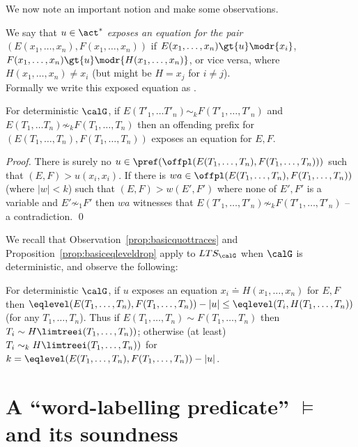 \documentclass[12pt]{article}
\begin{document}
We now note an important notion 
and make some 
observations.

\begin{defn}
We say that \mbox{$u\in\act^*$} 
\emph{exposes an equation for 
the pair} 
\\
$(E(x_1,\dots,x_n), F(x_1,\dots,x_n))$ 
if 
$E(x_1,\dots,x_n)\gt{u} \modr{x_i}$, 
$F(x_1,\dots,x_n)\gt{u} \modr{H(x_1,\dots,x_n)}$,
or vice versa, where $H(x_1,\dots,x_n)\neq
x_i$ (but might be $H=x_j$ for $i\neq j$).
\\
Formally we write this exposed equation 
as {}.
\end{defn}

\begin{prop}\label{prop:exposing}
For deterministic $\calG$,
if $E(T'_1,  \dots T'_{n})\sim_k F(T'_1,  \dots, T'_{n})$
and  $E(T_1,  \dots T_{n})\not\sim_k F(T_1,  \dots, T_{n})$
then
an offending prefix for  $(E(T_1,  \dots, T_{n}),F(T_1,  \dots,
T_{n}))$ exposes an equation for $E,F$.
\end{prop}

\begin{proof}
There is surely no 
$u\in\pref(\offpl(E(T_1,  \dots, T_{n}),F(T_1,  \dots, T_{n})))$
such that $(E,F)\gt{u}(x_i,x_i)$. If there is 
$wa\in\offpl(E(T_1,  \dots, T_{n}),F(T_1,  \dots, T_{n}))$ 
(where $|w|<k$)
such that 
$(E,F)\gt{w}(E',F')$ where none of $E',F'$ is a variable and
$E'\not\sim_1 F'$ then 
$wa$ witnesses that
$E(T'_1,  \dots, T'_{n})\not\sim_k F(T'_1,  \dots, T'_{n})$ -- a
contradiction.
\qed
\end{proof}


\noindent
We recall that Observation~\ref{prop:basicquottraces} 
and Proposition~\ref{prop:basiceqleveldrop} apply
to $LTS_{\calG}$  when 
$\calG$ is deterministic, and observe the following:

\begin{observ}
For deterministic $\calG$, 
if $u$ exposes an equation $x_i\doteq H(x_1,\dots,x_n)$ for 
$E,F$ then 
$\eqlevel(E(T_1,\dots,T_n),F(T_1,\dots,T_n))-|u|\leq
\eqlevel(T_i,H(T_1,\dots,T_n))$
(for any $T_1,\dots,T_n$). 
Thus if $E(T_1,\dots,T_n)\sim F(T_1,\dots,T_n)$ then
$T_i\sim H\limtreei(T_1,\dots,T_n))$; 
otherwise (at least)
$T_i\sim_k H\limtreei(T_1,\dots,T_n))$ for 
$k=\eqlevel(E(T_1,\dots,T_n),F(T_1,\dots,T_n))-|u|$.
\end{observ}




\section{A ``word-labelling predicate'' $\models$ and its soundness}\label{subsec:dersystem}
\end{document}
